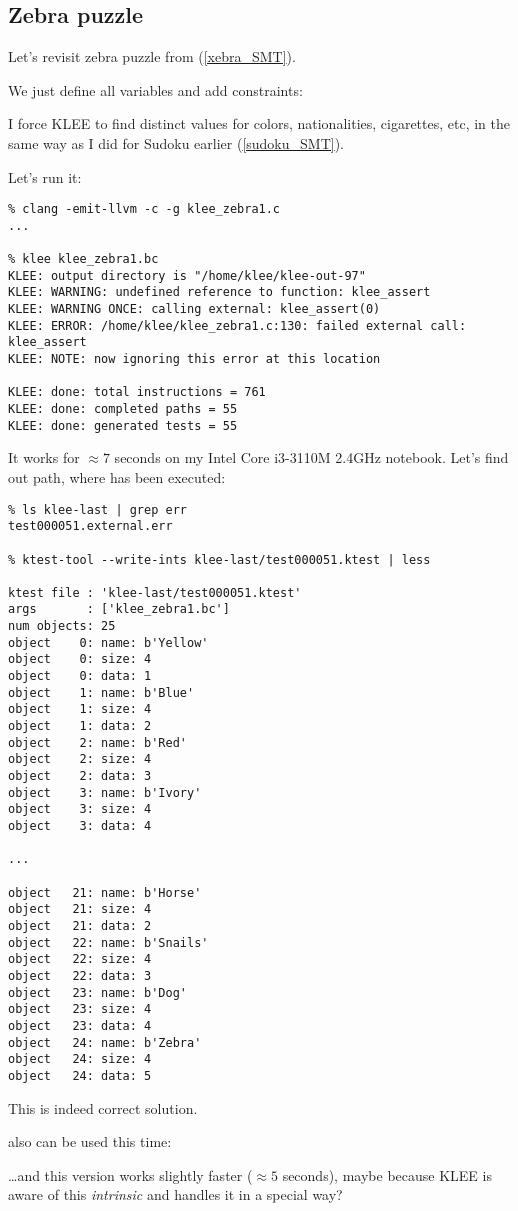 \subsection{Zebra puzzle}

Let's revisit zebra puzzle from (\ref{xebra_SMT}).

We just define all variables and add constraints:



I force KLEE to find distinct values for colors, nationalities, cigarettes, etc, in the same way as I did for Sudoku earlier 
(\ref{sudoku_SMT}).

Let's run it:

\begin{lstlisting}
% clang -emit-llvm -c -g klee_zebra1.c
...

% klee klee_zebra1.bc
KLEE: output directory is "/home/klee/klee-out-97"
KLEE: WARNING: undefined reference to function: klee_assert
KLEE: WARNING ONCE: calling external: klee_assert(0)
KLEE: ERROR: /home/klee/klee_zebra1.c:130: failed external call: klee_assert
KLEE: NOTE: now ignoring this error at this location

KLEE: done: total instructions = 761
KLEE: done: completed paths = 55
KLEE: done: generated tests = 55
\end{lstlisting}

It works for $\approx 7$ seconds on my Intel Core i3-3110M 2.4GHz notebook.
Let's find out path, where  has been executed:

\begin{lstlisting}
% ls klee-last | grep err
test000051.external.err

% ktest-tool --write-ints klee-last/test000051.ktest | less

ktest file : 'klee-last/test000051.ktest'
args       : ['klee_zebra1.bc']
num objects: 25
object    0: name: b'Yellow'
object    0: size: 4
object    0: data: 1
object    1: name: b'Blue'
object    1: size: 4
object    1: data: 2
object    2: name: b'Red'
object    2: size: 4
object    2: data: 3
object    3: name: b'Ivory'
object    3: size: 4
object    3: data: 4

...

object   21: name: b'Horse'
object   21: size: 4
object   21: data: 2
object   22: name: b'Snails'
object   22: size: 4
object   22: data: 3
object   23: name: b'Dog'
object   23: size: 4
object   23: data: 4
object   24: name: b'Zebra'
object   24: size: 4
object   24: data: 5
\end{lstlisting}

This is indeed correct solution.

 also can be used this time:



\dots and this version works slightly faster ($\approx 5$ seconds),
maybe because KLEE is aware of this \textit{intrinsic} and handles it in a special way?

